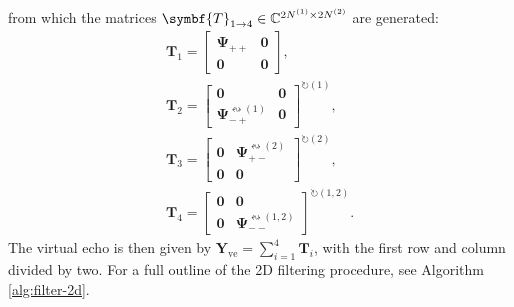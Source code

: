 from which the matrices $\symbf{T}_{1 \rightarrow 4} \in \mathbb{C}^{2 \None
\times 2 \Ntwo}$ are generated:
\begin{subequations}
    \begin{gather}
        \symbf{T}_1 =
        \begin{bmatrix}
            \symbf{\Psi}_{++} & \symbf{0} \\
            \symbf{0} & \symbf{0}
        \end{bmatrix}, \\
        \symbf{T}_2 =
        \begin{bmatrix}
            \symbf{0} & \symbf{0} \\
            \symbf{\Psi}_{-+}^{\leftrightsquigarrow (1)} & \symbf{0}
        \end{bmatrix}^{\circlearrowright (1)}, \\
        \symbf{T}_3 =
        \begin{bmatrix}
            \symbf{0} & \symbf{\Psi}_{+-}^{\leftrightsquigarrow (2)} \\
            \symbf{0} & \symbf{0}
        \end{bmatrix}^{\circlearrowright (2)}, \\
        \symbf{T}_4 =
        \begin{bmatrix}
            \symbf{0} & \symbf{0} \\
            \symbf{0} & \symbf{\Psi}_{--}^{\leftrightsquigarrow (1,2)}
        \end{bmatrix}^{\circlearrowright (1,2)}.
    \end{gather}
\end{subequations}
The virtual echo is then given by $\symbf{Y}_{\text{ve}} = \sum_{i=1}^4
\symbf{T}_i$, with the first row and column divided by two. For a full outline
of the 2D filtering procedure, see Algorithm \ref{alg:filter-2d}.

